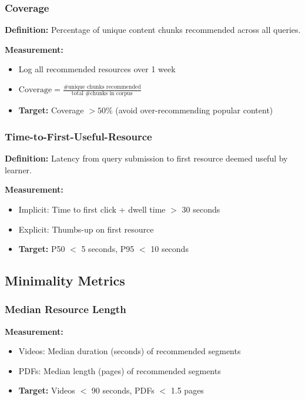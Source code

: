 \documentclass[11pt,letterpaper]{article}
\begin{document}
\subsubsection{Coverage}\label{subsubsec:coverage-metric}

\textbf{Definition:} Percentage of unique content chunks recommended across all queries.

\textbf{Measurement:}
\begin{itemize}
\item Log all recommended resources over 1 week
\item $\text{Coverage} = \frac{\text{\# unique chunks recommended}}{\text{total \# chunks in corpus}}$
\item \textbf{Target:} Coverage $> 50\%$ (avoid over-recommending popular content)
\end{itemize}

\subsubsection{Time-to-First-Useful-Resource}\label{subsubsec:time-to-first-useful}

\textbf{Definition:} Latency from query submission to first resource deemed useful by learner.

\textbf{Measurement:}
\begin{itemize}
\item Implicit: Time to first click + dwell time $>$ 30 seconds
\item Explicit: Thumbs-up on first resource
\item \textbf{Target:} P50 $<$ 5 seconds, P95 $<$ 10 seconds
\end{itemize}

\subsection{Minimality Metrics}\label{subsec:minimality-metrics}

\subsubsection{Median Resource Length}\label{subsubsec:median-resource-length}

\textbf{Measurement:}
\begin{itemize}
\item Videos: Median duration (seconds) of recommended segments
\item PDFs: Median length (pages) of recommended segments
\item \textbf{Target:} Videos $<$ 90 seconds, PDFs $<$ 1.5 pages
\end{itemize}
\end{document}
